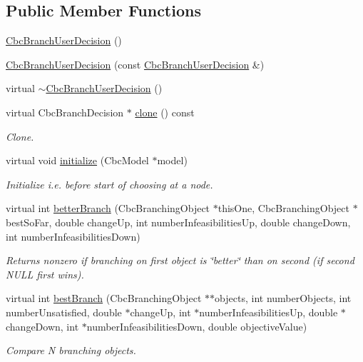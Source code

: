 \subsection*{Public Member Functions}
\begin{DoxyCompactItemize}
\item 
\hyperlink{classCbcBranchUserDecision_a9bee18186d293b3fd2da3e901bf71118}{Cbc\+Branch\+User\+Decision} ()
\item 
\hyperlink{classCbcBranchUserDecision_a8c91b60dbf6b7c963901d316437f9447}{Cbc\+Branch\+User\+Decision} (const \hyperlink{classCbcBranchUserDecision}{Cbc\+Branch\+User\+Decision} \&)
\item 
virtual \hyperlink{classCbcBranchUserDecision_a6dabb3ccc35f3c78ba56ba4e9a2d4a1b}{$\sim$\+Cbc\+Branch\+User\+Decision} ()
\item 
virtual Cbc\+Branch\+Decision $\ast$ \hyperlink{classCbcBranchUserDecision_a733a073ac6943512745d1c06f7c3bd03}{clone} () const
\begin{DoxyCompactList}\small\item\em Clone. \end{DoxyCompactList}\item 
virtual void \hyperlink{classCbcBranchUserDecision_adebf83d8e1a98bbdc5dc0377871f14f5}{initialize} (Cbc\+Model $\ast$model)
\begin{DoxyCompactList}\small\item\em Initialize i.\+e. before start of choosing at a node. \end{DoxyCompactList}\item 
virtual int \hyperlink{classCbcBranchUserDecision_a003e5732366e73c70f7e090ca4e98655}{better\+Branch} (Cbc\+Branching\+Object $\ast$this\+One, Cbc\+Branching\+Object $\ast$best\+So\+Far, double change\+Up, int number\+Infeasibilities\+Up, double change\+Down, int number\+Infeasibilities\+Down)
\begin{DoxyCompactList}\small\item\em Returns nonzero if branching on first object is \char`\"{}better\char`\"{} than on second (if second N\+U\+LL first wins). \end{DoxyCompactList}\item 
virtual int \hyperlink{classCbcBranchUserDecision_a02b7bc3347701d66c19b9828c1f877c2}{best\+Branch} (Cbc\+Branching\+Object $\ast$$\ast$objects, int number\+Objects, int number\+Unsatisfied, double $\ast$change\+Up, int $\ast$number\+Infeasibilities\+Up, double $\ast$change\+Down, int $\ast$number\+Infeasibilities\+Down, double objective\+Value)
\begin{DoxyCompactList}\small\item\em Compare N branching objects. \end{DoxyCompactList}\end{DoxyCompactItemize}
